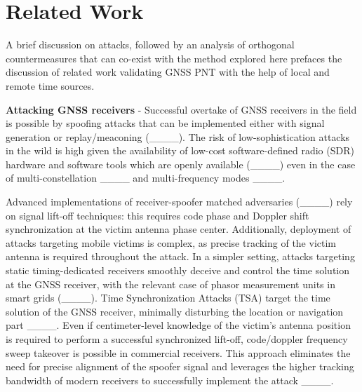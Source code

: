 \section{Related Work}
\label{section:background}

A brief discussion on attacks, followed by an analysis of orthogonal countermeasures that can co-exist with the method explored here prefaces the discussion of related work validating GNSS PNT with the help of local and remote time sources. 

\textbf{Attacking GNSS receivers} - Successful overtake of GNSS receivers in the field is possible by spoofing attacks that can be implemented either with signal generation or replay/meaconing (____). The risk of low-sophistication attacks in the wild is high given the availability of low-cost software-defined radio (SDR) hardware and software tools which are openly available (____) even in the case of multi-constellation ____ and multi-frequency modes ____.

Advanced implementations of receiver-spoofer matched adversaries (____) rely on signal lift-off techniques: this requires code phase and Doppler shift synchronization at the victim antenna phase center. Additionally, deployment of attacks targeting mobile victims is complex, as precise tracking of the victim antenna is required throughout the attack. In a simpler setting, attacks targeting static timing-dedicated receivers smoothly deceive and control the time solution at the GNSS receiver, with the relevant case of phasor measurement units in smart grids (____). Time Synchronization Attacks (TSA) target the time solution of the GNSS receiver, minimally disturbing the location or navigation part ____. Even if centimeter-level knowledge of the victim's antenna position is required to perform a successful synchronized lift-off, code/doppler frequency sweep takeover is possible in commercial receivers. This approach eliminates the need for precise alignment of the spoofer signal and leverages the higher tracking bandwidth of modern receivers to successfully implement the attack ____.




